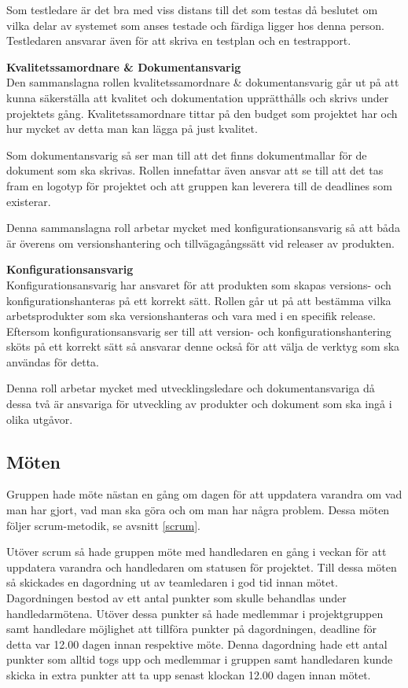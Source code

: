 Som testledare är det bra med viss distans till det som testas då beslutet om vilka delar av systemet som anses testade och färdiga ligger hos denna person. Testledaren ansvarar även för att skriva en testplan och en testrapport.

\textbf{Kvalitetssamordnare \& Dokumentansvarig}\\
Den sammanslagna rollen kvalitetssamordnare \& dokumentansvarig går ut på att kunna säkerställa att kvalitet och dokumentation upprätthålls och skrivs under projektets gång. Kvalitetssamordnare tittar på den budget som projektet har och hur mycket av detta man kan lägga på just kvalitet.

Som dokumentansvarig så ser man till att det finns dokumentmallar för de dokument som ska skrivas. Rollen innefattar även ansvar att se till att det tas fram en logotyp för projektet och att gruppen kan leverera till de deadlines som existerar.

Denna sammanslagna roll arbetar mycket med konfigurationsansvarig så att båda är överens om versionshantering och tillvägagångssätt vid releaser av produkten.

\textbf{Konfigurationsansvarig}
\\Konfigurationsansvarig har ansvaret för att produkten som skapas versions- och konfigurationshanteras på ett korrekt sätt. Rollen går ut på att bestämma vilka arbetsprodukter som ska versionshanteras och vara med i en specifik release. Eftersom konfigurationsansvarig ser till att version- och konfigurationshantering sköts på ett korrekt sätt så ansvarar denne också för att välja de verktyg som ska användas för detta.

Denna roll arbetar mycket med utvecklingsledare och dokumentansvariga då dessa två är ansvariga för utveckling av produkter och dokument som ska ingå i olika utgåvor.

\subsection{Möten}
Gruppen hade möte nästan en gång om dagen för att uppdatera varandra om vad man har gjort, vad man ska göra och om man har några problem. Dessa möten följer scrum-metodik, se avsnitt \ref{scrum}.

Utöver scrum så hade gruppen möte med handledaren en gång i veckan för att uppdatera varandra och handledaren om statusen för projektet. Till dessa möten så skickades en dagordning ut av teamledaren i god tid innan mötet. Dagordningen bestod av ett antal punkter som skulle behandlas under handledarmötena. Utöver dessa punkter så hade medlemmar i projektgruppen samt handledare möjlighet att tillföra punkter på dagordningen, deadline för detta var 12.00 dagen innan respektive möte. 
Denna dagordning hade ett antal punkter som alltid togs upp och medlemmar i gruppen samt handledaren kunde skicka in extra punkter att ta upp senast klockan 12.00 dagen innan mötet.

